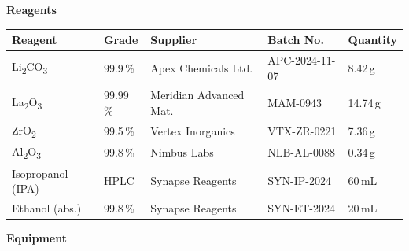 
\begin{tcolorbox}[notebox, title={\faFlask\quad Materials \& Equipment}]

  \textbf{Reagents}

  \vspace{4pt}
  \begin{tabularx}{\linewidth}{@{}llXll@{}}
    \toprule
    \rowcolor{LightSteel}
    \textbf{\small Reagent} & \textbf{\small Grade} & \textbf{\small Supplier} &
    \textbf{\small Batch No.} & \textbf{\small Quantity} \\
    \midrule
    Li\textsubscript{2}CO\textsubscript{3}  & 99.9\,\% & Apex Chemicals Ltd.   & APC-2024-11-07 & 8.42\,g \\
    La\textsubscript{2}O\textsubscript{3}   & 99.99\,\% & Meridian Advanced Mat. & MAM-0943       & 14.74\,g \\
    ZrO\textsubscript{2}                    & 99.5\,\% & Vertex Inorganics      & VTX-ZR-0221    & 7.36\,g \\
    Al\textsubscript{2}O\textsubscript{3}   & 99.8\,\% & Nimbus Labs            & NLB-AL-0088    & 0.34\,g \\
    Isopropanol (IPA)                       & HPLC    & Synapse Reagents       & SYN-IP-2024    & 60\,mL \\
    Ethanol (abs.)                          & 99.8\,\% & Synapse Reagents       & SYN-ET-2024    & 20\,mL \\
    \bottomrule
  \end{tabularx}

  \vspace{10pt}
  \textbf{Equipment}


\end{tcolorbox}
